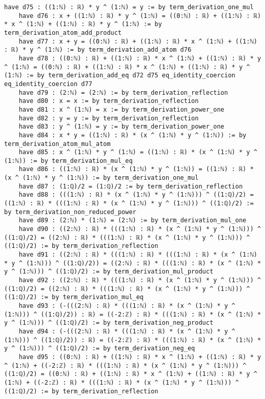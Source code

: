 \documentclass{article}
\begin{document}
\begin{tcolorbox}[colback=white!10, width=\linewidth]
\begin{lstlisting}[language=Lean4]
    have d75 : ((1:ℕ) : ℝ) * y ^ (1:ℕ) = y := by term_derivation_one_mul
    have d76 : x + ((1:ℕ) : ℝ) * y ^ (1:ℕ) = ((0:ℕ) : ℝ) + ((1:ℕ) : ℝ) * x ^ (1:ℕ) + ((1:ℕ) : ℝ) * y ^ (1:ℕ) := by term_derivation_atom_add_product
    have d77 : x + y = ((0:ℕ) : ℝ) + ((1:ℕ) : ℝ) * x ^ (1:ℕ) + ((1:ℕ) : ℝ) * y ^ (1:ℕ) := by term_derivation_add_atom d76
    have d78 : ((0:ℕ) : ℝ) + ((1:ℕ) : ℝ) * x ^ (1:ℕ) + ((1:ℕ) : ℝ) * y ^ (1:ℕ) = ((0:ℕ) : ℝ) + ((1:ℕ) : ℝ) * x ^ (1:ℕ) + ((1:ℕ) : ℝ) * y ^ (1:ℕ) := by term_derivation_add_eq d72 d75 eq_identity_coercion eq_identity_coercion d77
    have d79 : (2:ℕ) = (2:ℕ) := by term_derivation_reflection
    have d80 : x = x := by term_derivation_reflection
    have d81 : x ^ (1:ℕ) = x := by term_derivation_power_one
    have d82 : y = y := by term_derivation_reflection
    have d83 : y ^ (1:ℕ) = y := by term_derivation_power_one
    have d84 : x * y = ((1:ℕ) : ℝ) * (x ^ (1:ℕ) * y ^ (1:ℕ)) := by term_derivation_atom_mul_atom
    have d85 : x ^ (1:ℕ) * y ^ (1:ℕ) = ((1:ℕ) : ℝ) * (x ^ (1:ℕ) * y ^ (1:ℕ)) := by term_derivation_mul_eq
    have d86 : ((1:ℕ) : ℝ) * (x ^ (1:ℕ) * y ^ (1:ℕ)) = ((1:ℕ) : ℝ) * (x ^ (1:ℕ) * y ^ (1:ℕ)) := by term_derivation_one_mul
    have d87 : (1:ℚ)/2 = (1:ℚ)/2 := by term_derivation_reflection
    have d88 : (((1:ℕ) : ℝ) * (x ^ (1:ℕ) * y ^ (1:ℕ))) ^ ((1:ℚ)/2) = ((1:ℕ) : ℝ) * (((1:ℕ) : ℝ) * (x ^ (1:ℕ) * y ^ (1:ℕ))) ^ ((1:ℚ)/2) := by term_derivation_non_reduced_power
    have d89 : (2:ℕ) * (1:ℕ) = (2:ℕ) := by term_derivation_mul_one
    have d90 : ((2:ℕ) : ℝ) * (((1:ℕ) : ℝ) * (x ^ (1:ℕ) * y ^ (1:ℕ))) ^ ((1:ℚ)/2) = ((2:ℕ) : ℝ) * (((1:ℕ) : ℝ) * (x ^ (1:ℕ) * y ^ (1:ℕ))) ^ ((1:ℚ)/2) := by term_derivation_reflection
    have d91 : ((2:ℕ) : ℝ) * (((1:ℕ) : ℝ) * (((1:ℕ) : ℝ) * (x ^ (1:ℕ) * y ^ (1:ℕ))) ^ ((1:ℚ)/2)) = ((2:ℕ) : ℝ) * (((1:ℕ) : ℝ) * (x ^ (1:ℕ) * y ^ (1:ℕ))) ^ ((1:ℚ)/2) := by term_derivation_mul_product
    have d92 : ((2:ℕ) : ℝ) * (((1:ℕ) : ℝ) * (x ^ (1:ℕ) * y ^ (1:ℕ))) ^ ((1:ℚ)/2) = ((2:ℕ) : ℝ) * (((1:ℕ) : ℝ) * (x ^ (1:ℕ) * y ^ (1:ℕ))) ^ ((1:ℚ)/2) := by term_derivation_mul_eq
    have d93 : (-(((2:ℕ) : ℝ) * (((1:ℕ) : ℝ) * (x ^ (1:ℕ) * y ^ (1:ℕ))) ^ ((1:ℚ)/2)) : ℝ) = ((-2:ℤ) : ℝ) * (((1:ℕ) : ℝ) * (x ^ (1:ℕ) * y ^ (1:ℕ))) ^ ((1:ℚ)/2) := by term_derivation_neg_product
    have d94 : (-(((2:ℕ) : ℝ) * (((1:ℕ) : ℝ) * (x ^ (1:ℕ) * y ^ (1:ℕ))) ^ ((1:ℚ)/2)) : ℝ) = ((-2:ℤ) : ℝ) * (((1:ℕ) : ℝ) * (x ^ (1:ℕ) * y ^ (1:ℕ))) ^ ((1:ℚ)/2) := by term_derivation_neg_eq
    have d95 : ((0:ℕ) : ℝ) + ((1:ℕ) : ℝ) * x ^ (1:ℕ) + ((1:ℕ) : ℝ) * y ^ (1:ℕ) + ((-2:ℤ) : ℝ) * (((1:ℕ) : ℝ) * (x ^ (1:ℕ) * y ^ (1:ℕ))) ^ ((1:ℚ)/2) = ((0:ℕ) : ℝ) + ((1:ℕ) : ℝ) * x ^ (1:ℕ) + ((1:ℕ) : ℝ) * y ^ (1:ℕ) + ((-2:ℤ) : ℝ) * (((1:ℕ) : ℝ) * (x ^ (1:ℕ) * y ^ (1:ℕ))) ^ ((1:ℚ)/2) := by term_derivation_reflection

\end{lstlisting}
\end{tcolorbox}
\end{document}
